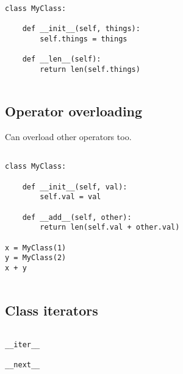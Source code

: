 \begin{verbatim}

class MyClass:

    def __init__(self, things):
        self.things = things

    def __len__(self):
        return len(self.things)
        
\end{verbatim}

\subsection{Operator overloading}

Can overload other operators too.
\begin{verbatim}

class MyClass:

    def __init__(self, val):
        self.val = val

    def __add__(self, other):
        return len(self.val + other.val)

x = MyClass(1)
y = MyClass(2)
x + y
        
\end{verbatim}

\subsection{Class iterators}

\begin{verbatim}

__iter__

__next__
\end{verbatim}

